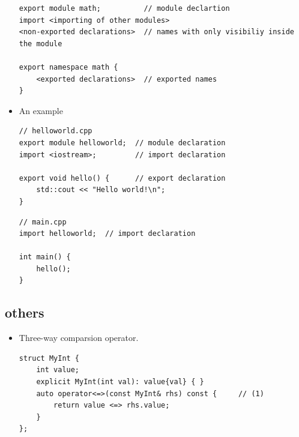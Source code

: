 \documentclass[a4paper,11pt,twoside]{book}
\begin{document}
\begin{itemize}
\begin{lstlisting}
export module math;          // module declartion 
import <importing of other modules> 
<non-exported declarations>  // names with only visibiliy inside the module

export namespace math {
    <exported declarations>  // exported names 
}
\end{lstlisting}
	
	\item An example
\begin{lstlisting}
// helloworld.cpp
export module helloworld;  // module declaration
import <iostream>;         // import declaration

export void hello() {      // export declaration
	std::cout << "Hello world!\n";
}
\end{lstlisting}	


\begin{lstlisting}
// main.cpp
import helloworld;  // import declaration

int main() {
	hello();
}	
\end{lstlisting}
	
	
\end{itemize}



\subsection{others}

\begin{itemize}
	\item Three-way comparsion operator.
\begin{lstlisting}
struct MyInt {
    int value;
    explicit MyInt(int val): value{val} { }
    auto operator<=>(const MyInt& rhs) const {     // (1)      
        return value <=> rhs.value;
    }
};
\end{lstlisting}	

\end{itemize}
\end{document}
